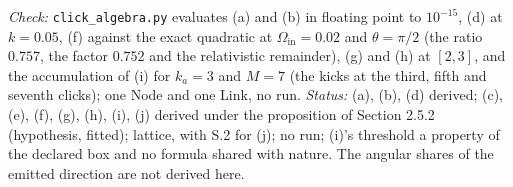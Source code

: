 \begin{derivation}
\emph{Check:} \texttt{click\_algebra.py} evaluates (a) and (b) in floating point to $10^{-15}$, (d) at $k = 0.05$, (f) against the exact quadratic at $\Omega_{\mathrm{in}} = 0.02$ and $\theta = \pi / 2$ (the ratio $0.757$, the factor $0.752$ and the relativistic remainder), (g) and (h) at $[2, 3]$, and the accumulation of (i) for $k_a = 3$ and $M = 7$ (the kicks at the third, fifth and seventh clicks); one Node and one Link, no run.
\emph{Status:} (a), (b), (d) derived; (c), (e), (f), (g), (h), (i), (j) derived under the proposition of Section 2.5.2 (hypothesis, fitted); lattice, with S.2 for (j); no run; (i)'s threshold a property of the declared box and no formula shared with nature. The angular shares of the emitted direction are not derived here.
\end{derivation}
